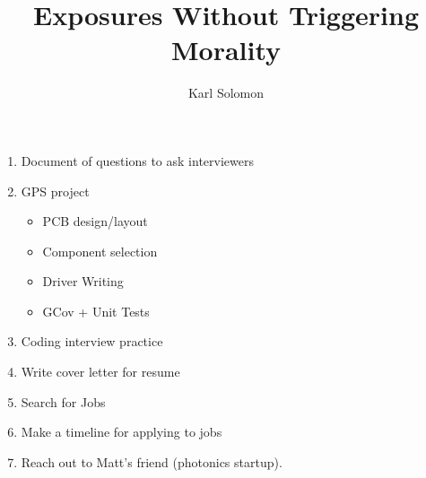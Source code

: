 \documentclass{article}
\begin{document}
\title{Exposures Without Triggering Morality}
\author{Karl Solomon}
\maketitle
\begin{enumerate}
	\item Document of questions to ask interviewers
	\item GPS project
	      \begin{itemize}
		      \item PCB design/layout
		      \item Component selection
		      \item Driver Writing
		      \item GCov + Unit Tests
	      \end{itemize}
	\item Coding interview practice
	\item Write cover letter for resume
	\item Search for Jobs
	\item Make a timeline for applying to jobs
	\item Reach out to Matt's friend (photonics startup).
\end{enumerate}
\end{document}
